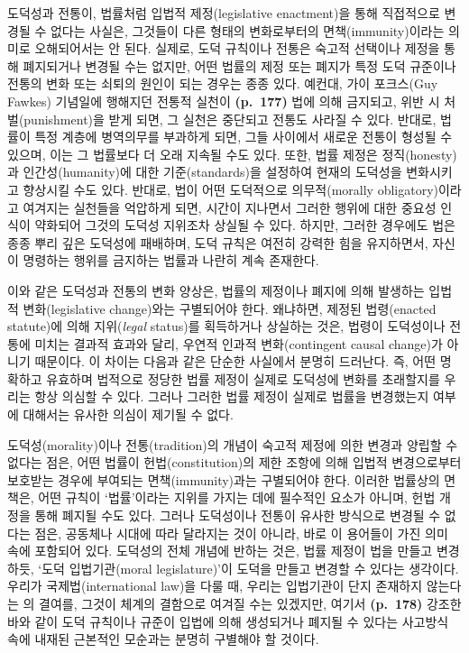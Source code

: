 도덕성과 전통이, 법률처럼 입법적 제정(legislative enactment)을 통해
직접적으로 변경될 수 없다는 사실은, 그것들이 다른 형태의 변화로부터의
면책(immunity)이라는 의미로 오해되어서는 안 된다. 실제로, 도덕 규칙이나
전통은 숙고적 선택이나 제정을 통해 폐지되거나 변경될 수는 없지만, 어떤
법률의 제정 또는 폐지가 특정 도덕 규준이나 전통의 변화 또는 쇠퇴의
원인이 되는 경우는 종종 있다. 예컨대, 가이 포크스(Guy Fawkes) 기념일에
행해지던 전통적 실천이 \textbf{(p.~177)} 법에 의해 금지되고, 위반 시
처벌(punishment)을 받게 되면, 그 실천은 중단되고 전통도 사라질 수 있다.
반대로, 법률이 특정 계층에 병역의무를 부과하게 되면, 그들 사이에서
새로운 전통이 형성될 수 있으며, 이는 그 법률보다 더 오래 지속될 수도
있다. 또한, 법률 제정은 정직(honesty)과 인간성(humanity)에 대한
기준(standards)을 설정하여 현재의 도덕성을 변화시키고 향상시킬 수도
있다. 반대로, 법이 어떤 도덕적으로 의무적(morally obligatory)이라고
여겨지는 실천들을 억압하게 되면, 시간이 지나면서 그러한 행위에 대한
중요성 인식이 약화되어 그것의 도덕성 지위조차 상실될 수 있다. 하지만,
그러한 경우에도 법은 종종 뿌리 깊은 도덕성에 패배하며, 도덕 규칙은
여전히 강력한 힘을 유지하면서, 자신이 명령하는 행위를 금지하는 법률과
나란히 계속 존재한다.

이와 같은 도덕성과 전통의 변화 양상은, 법률의 제정이나 폐지에 의해
발생하는 입법적 변화(legislative change)와는 구별되어야 한다. 왜냐하면,
제정된 법령(enacted statute)에 의해  지위(\emph{legal}
status)를 획득하거나 상실하는 것은, 법령이 도덕성이나 전통에 미치는
결과적 효과와 달리, 우연적 인과적 변화(contingent causal change)가
아니기 때문이다. 이 차이는 다음과 같은 단순한 사실에서 분명히 드러난다.
즉, 어떤 명확하고 유효하며 법적으로 정당한 법률 제정이 실제로 도덕성에
변화를 초래할지를 우리는 항상 의심할 수 있다. 그러나 그러한 법률 제정이
실제로 법률을 변경했는지 여부에 대해서는 유사한 의심이 제기될 수 없다.

도덕성(morality)이나 전통(tradition)의 개념이 숙고적 제정에 의한 변경과
양립할 수 없다는 점은, 어떤 법률이 헌법(constitution)의 제한 조항에 의해
입법적 변경으로부터 보호받는 경우에 부여되는 면책(immunity)과는
구별되어야 한다. 이러한 법률상의 면책은, 어떤 규칙이 `법률'이라는 지위를
가지는 데에 필수적인 요소가 아니며, 헌법 개정을 통해 폐지될 수도 있다.
그러나 도덕성이나 전통이 유사한 방식으로 변경될 수 없다는 점은, 공동체나
시대에 따라 달라지는 것이 아니라, 바로 이 용어들이 가진 의미 속에
포함되어 있다. 도덕성의 전체 개념에 반하는 것은, 법률 제정이 법을 만들고
변경하듯, `도덕 입법기관(moral legislature)'이 도덕을 만들고 변경할 수
있다는 생각이다. 우리가 국제법(international law)을 다룰 때, 우리는
입법기관이 단지 존재하지 않는다는 의 결여를,
그것이 체계의 결함으로 여겨질 수는 있겠지만, 여기서 \textbf{(p.~178)}
강조한 바와 같이 도덕 규칙이나 규준이 입법에 의해 생성되거나 폐지될 수
있다는 사고방식 속에 내재된 근본적인 모순과는 분명히 구별해야 할 것이다.

